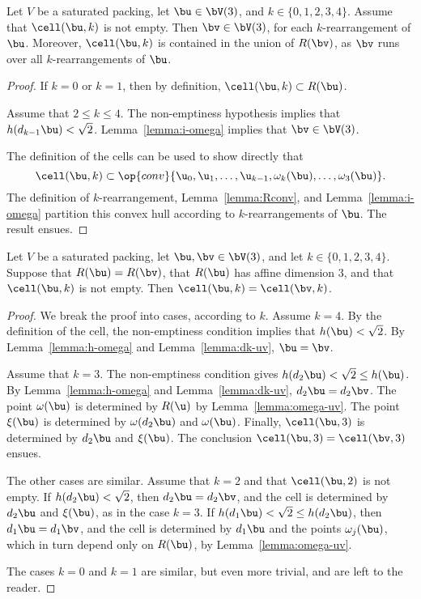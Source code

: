 \begin{lemma}[]\label{lemma:cell-in-rogers} %
  Let $V$ be a saturated packing, let $\bu\in \bV(3)$, and $k\in
  \{0,1,2,3,4\}$.  Assume that $\cell(\bu,k)$ is not empty.
  Then $\bv\in \bV(3)$, for each $k$-rearrangement of $\bu$.
  Moreover,
  $\cell(\bu,k)$ is contained in the union of
  $R(\bv)$, as $\bv$ runs over all $k$-rearrangements of $\bu$.
\end{lemma}

\begin{proof}  If $k=0$ or $k=1$, 
then by definition, $\cell(\bu,k)\subset R(\bu)$.

Assume that  $2\le k\le 4$.  The non-emptiness hypothesis
implies that $h(d_{k-1}\bu)<\sqrt2$.  Lemma~\ref{lemma:i-omega} implies
that $\bv\in \bV(3)$.

The definition of the cells can be used to show directly that
\[
\cell(\bu,k)\subset 
\op{conv}\{\u_0,\u_1,\ldots,\u_{k-1},\omega_{k}(\bu),\ldots,
\omega_3(\bu)\}.
\]
The definition of $k$-rearrangement, Lemma~\ref{lemma:Rconv}, and
Lemma~\ref{lemma:i-omega} partition this convex hull according to
$k$-rearrangements of $\bu$.  The result ensues.
\end{proof}

\begin{lemma}[]\label{lemma:cell-disjoint} %
Let $V$ be a saturated packing, let $\bu,\bv\in \bV(3)$, and let
$k\in \{0,1,2,3,4\}$.  Suppose that $R(\bu)=R(\bv)$, that $R(\bu)$
has affine dimension $3$,  and that
$\cell(\bu,k)$ is not empty.   Then
$\cell(\bu,k)=\cell(\bv,k)$.
\end{lemma}

\begin{proof} 
We break the proof into cases, according to $k$.
Assume $k=4$.  By the definition of the cell, the non-emptiness condition
implies that $h(\bu)<\sqrt2$.  By Lemma~\ref{lemma:h-omega} and Lemma~\ref{lemma:dk-uv},  $\bu=\bv$.

Assume that $k=3$.  The non-emptiness condition gives
$h(d_2\bu)<\sqrt2\le h(\bu)$.  By Lemma~\ref{lemma:h-omega} and
Lemma~\ref{lemma:dk-uv}, $d_2\bu=d_2\bv$.  The point $\omega(\bu)$ is
determined by $R(\u)$ by Lemma~\ref{lemma:omega-uv}.  The point
$\xi(\bu)$ is determined by $\omega(d_2\bu)$ and $\omega(\bu)$.
Finally, $\cell(\bu,3)$ is determined by $d_2\bu$ and $\xi(\bu)$.  The
conclusion $\cell(\bu,3)=\cell(\bv,3)$ ensues.

The other cases are similar.  Assume that $k=2$ and that
$\cell(\bu,2)$ is not empty.  If $h(d_2\bu)<\sqrt2$, then
$d_2\bu=d_2\bv$, and the cell is determined by $d_2\bu$ and
$\xi(\bu)$, as in the case $k=3$.  If $h(d_1\bu)<\sqrt2\le h(d_2\bu)$,
then $d_1\bu=d_1\bv$, and the cell is determined by $d_1\bu$ and the
points $\omega_j(\bu)$, which in turn depend only on $R(\bu)$, by
Lemma~\ref{lemma:omega-uv}.

The cases $k=0$ and $k=1$ are similar, but even more trivial, and are
left to the reader.
\end{proof}

